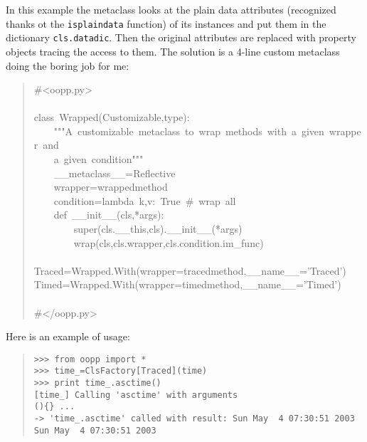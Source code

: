 \documentclass[10pt,english]{article}
\begin{document}
In this example the metaclass looks at the plain data attributes (recognized
thanks ot the \texttt{isplaindata} function) of its instances and put them
in the dictionary \texttt{cls.datadic}. Then the original attributes are replaced
with property objects tracing the access to them. The solution is a 4-line 
custom metaclass doing the boring job for me:
\begin{quote}
\begin{ttfamily}\begin{flushleft}
\mbox{{\#}<oopp.py>}\\
\mbox{}\\
\mbox{class~Wrapped(Customizable,type):}\\
\mbox{~~~~"""A~customizable~metaclass~to~wrap~methods~with~a~given~wrapper~and}\\
\mbox{~~~~a~given~condition"""}\\
\mbox{~~~~{\_}{\_}metaclass{\_}{\_}=Reflective}\\
\mbox{~~~~wrapper=wrappedmethod}\\
\mbox{~~~~condition=lambda~k,v:~True~{\#}~wrap~all}\\
\mbox{~~~~def~{\_}{\_}init{\_}{\_}(cls,*args):}\\
\mbox{~~~~~~~~super(cls.{\_}{\_}this,cls).{\_}{\_}init{\_}{\_}(*args)}\\
\mbox{~~~~~~~~wrap(cls,cls.wrapper,cls.condition.im{\_}func)}\\
\mbox{}\\
\mbox{Traced=Wrapped.With(wrapper=tracedmethod,{\_}{\_}name{\_}{\_}='Traced')}\\
\mbox{Timed=Wrapped.With(wrapper=timedmethod,{\_}{\_}name{\_}{\_}='Timed')}\\
\mbox{}\\
\mbox{{\#}</oopp.py>}
\end{flushleft}\end{ttfamily}
\end{quote}

Here is an example of usage:
\begin{quote}
\begin{verbatim}>>> from oopp import *
>>> time_=ClsFactory[Traced](time)
>>> print time_.asctime()
[time_] Calling 'asctime' with arguments
(){} ...
-> 'time_.asctime' called with result: Sun May  4 07:30:51 2003
Sun May  4 07:30:51 2003\end{verbatim}
\end{quote}
\end{document}
